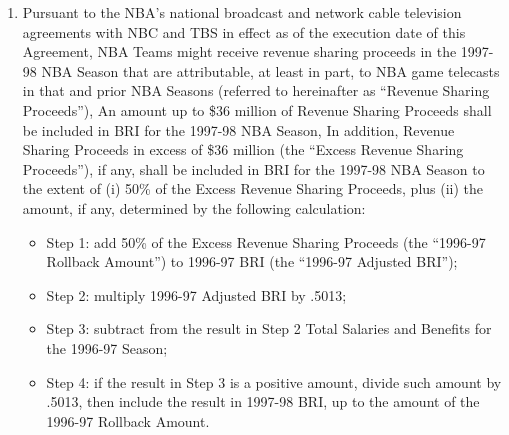 \documentclass[
]{book}
\providecommand{\tightlist}{%
  \setlength{\itemsep}{0pt}\setlength{\parskip}{0pt}}
\begin{document}
\begin{enumerate}
\begin{enumerate}
\begin{enumerate}
      (A) New York Knicks transaction with MSG Network regarding the sale of local media rights (the ``MSG Network Transaction''): BRI for the Knicks for the 1995-96 NBA Season shall include an amount equal to the net proceeds included in BRI attributable to the Los Angeles Lakers' sale, license or other conveyance of all local media rights (including, but not limited to, broadcast and cable television and radio). In each subsequent Season covered by this Agreement, this amount shall be increased (or decreased, as the case may be), for each category of local media rights, by the average of the League-wide average percentage increase (or decrease) for each such category.
      (B) New York Knicks transactions with related parties involving signage: BRI for the Knicks for the 1995-96 NBA Season shall include \$3,000,000 for signage. In each subsequent Season covered by this Agreement, this amount shall be increased (or decreased, as the case may be) by the League-wide average percentage increase (or decrease) in signage as determined in such subsections (a)(1)(v) and (a)(1)(vi),
    \end{enumerate}
  \item
    Pursuant to the NBA's national broadcast and network cable television agreements with NBC and TBS in effect as of the execution date of this Agreement, NBA Teams might receive revenue sharing proceeds in the 1997-98 NBA Season that are attributable, at least in part, to NBA game telecasts in that and prior NBA Seasons (referred to hereinafter as ``Revenue Sharing Proceeds''), An amount up to \$36 million of Revenue Sharing Proceeds shall be included in BRI for the 1997-98 NBA Season, In addition, Revenue Sharing Proceeds in excess of \$36 million (the ``Excess Revenue Sharing Proceeds''), if any, shall be included in BRI for the 1997-98 NBA Season to the extent of (i) 50\% of the Excess Revenue Sharing Proceeds, plus (ii) the amount, if any, determined by the following calculation:

    \begin{itemize}
    \tightlist
    \item
      Step 1: add 50\% of the Excess Revenue Sharing Proceeds (the ``1996-97 Rollback Amount'') to 1996-97 BRI (the ``1996-97 Adjusted BRI'');
    \item
      Step 2: multiply 1996-97 Adjusted BRI by .5013;
    \item
      Step 3: subtract from the result in Step 2 Total Salaries and Benefits for the 1996-97 Season;
    \item
      Step 4: if the result in Step 3 is a positive amount, divide such amount by .5013, then include the result in 1997-98 BRI, up to the amount of the 1996-97 Rollback Amount.
    \end{itemize}


\end{enumerate}
\end{enumerate}
\end{document}
